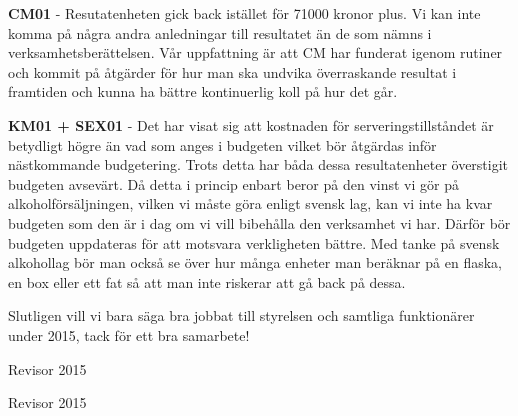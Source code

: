 \documentclass[../_main/handlingar.tex]{subfiles}
\begin{document}
\textbf{CM01} - Resutatenheten gick back istället för 71000 kronor plus. Vi kan inte komma på några andra anledningar till resultatet än de som nämns i verksamhetsberättelsen. Vår uppfattning är att CM har funderat igenom rutiner och kommit på åtgärder för hur man ska undvika överraskande resultat i framtiden och kunna ha bättre kontinuerlig koll på hur det går.

\newpage

\textbf{KM01 + SEX01} - Det har visat sig att kostnaden för serveringstillståndet är betydligt högre än vad som anges i budgeten vilket bör åtgärdas inför nästkommande budgetering. Trots detta har båda dessa resultatenheter överstigit budgeten avsevärt. Då detta i princip enbart beror på den vinst vi gör på alkoholförsäljningen, vilken vi måste göra enligt svensk lag, kan vi inte ha kvar budgeten som den är i dag om vi vill bibehålla den verksamhet vi har. Därför bör budgeten uppdateras för att motsvara verkligheten bättre. Med tanke på svensk alkohollag bör man också se över hur många enheter man beräknar på en flaska, en box eller ett fat så att man inte riskerar att gå back på dessa.

Slutligen vill vi bara säga bra jobbat till styrelsen och samtliga funktionärer under 2015, tack för ett bra samarbete!

\begin{signatures}{2}
    \mvh
    \signature{Sara Gunnarsson}{Revisor 2015}
    \signature{Kajsa Eriksson Rosenqvist}{Revisor 2015}
\end{signatures}
\end{document}
